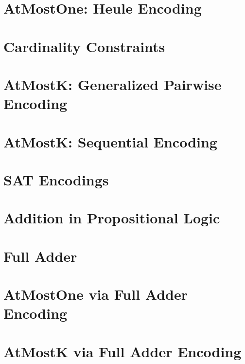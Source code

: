 \documentclass[12pt,a4paper,twoside]{book}
\begin{document}
\section{AtMostOne: Heule Encoding}

\label{s_7_5}

\section{Cardinality Constraints }

\label{s_7_6}

\section{AtMostK: Generalized Pairwise Encoding}

\label{s_7_7}

\section{AtMostK: Sequential Encoding}

\label{s_7_8}

\section{SAT Encodings}

\label{s_7_9}

\section{Addition in Propositional Logic}

\label{s_7_10}

\section{Full Adder}

\label{s_7_11}

\section{AtMostOne via Full Adder Encoding}

\label{s_7_12}

\section{AtMostK via Full Adder Encoding}

\label{s_7_13}
\end{document}

